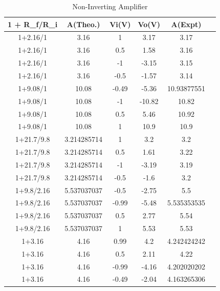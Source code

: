 \documentclass[10pt]{scrartcl}
\theoremstyle{definition}
\begin{document}
\begin{table}[!ht]
    \centering
    \begin{tabular}{|c|c|c|c|c|c|}
    \hline
        \textbf{1 + R\_f/R\_i} & \textbf{A(Theo.)} & \textbf{Vi(V)} & \textbf{Vo(V)} & \textbf{A(Expt)} \\ \hline
        1+2.16/1 & 3.16 & 1 & 3.17 & 3.17 \\ \hline
        1+2.16/1 & 3.16 & 0.5 & 1.58 & 3.16 \\ \hline
        1+2.16/1 & 3.16 & -1 & -3.15 & 3.15 \\ \hline
        1+2.16/1 & 3.16 & -0.5 & -1.57 & 3.14 \\ \hline
        1+9.08/1 & 10.08 & -0.49 & -5.36 & 10.93877551 \\ \hline
        1+9.08/1 & 10.08 & -1 & -10.82 & 10.82 \\ \hline
        1+9.08/1 & 10.08 & 0.5 & 5.46 & 10.92 \\ \hline
        1+9.08/1 & 10.08 & 1 & 10.9 & 10.9 \\ \hline
        1+21.7/9.8 & 3.214285714 & 1 & 3.2 & 3.2 \\ \hline
        1+21.7/9.8 & 3.214285714 & 0.5 & 1.61 & 3.22 \\ \hline
        1+21.7/9.8 & 3.214285714 & -1 & -3.19 & 3.19 \\ \hline
        1+21.7/9.8 & 3.214285714 & -0.5 & -1.6 & 3.2 \\ \hline
        1+9.8/2.16 & 5.537037037 & -0.5 & -2.75 & 5.5 \\ \hline
        1+9.8/2.16 & 5.537037037 & -0.99 & -5.48 & 5.535353535 \\ \hline
        1+9.8/2.16 & 5.537037037 & 0.5 & 2.77 & 5.54 \\ \hline
        1+9.8/2.16 & 5.537037037 & 1 & 5.53 & 5.53 \\ \hline
        1+3.16 & 4.16 & 0.99 & 4.2 & 4.242424242 \\ \hline
        1+3.16 & 4.16 & 0.5 & 2.11 & 4.22 \\ \hline
        1+3.16 & 4.16 & -0.99 & -4.16 & 4.202020202 \\ \hline
        1+3.16 & 4.16 & -0.49 & -2.04 & 4.163265306 \\ \hline
    \end{tabular}
    \caption{Non-Inverting Amplifier}
\end{table}
\end{document}
